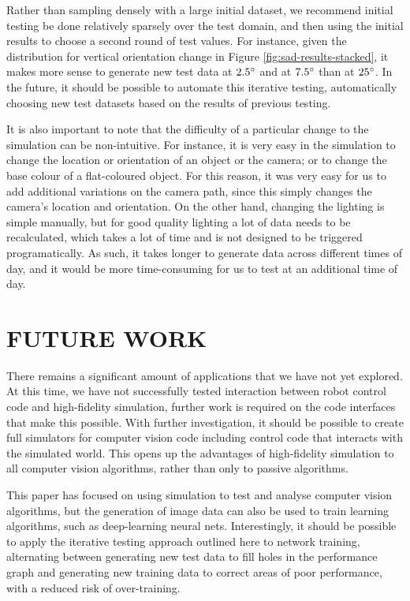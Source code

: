 \documentclass[letterpaper, 10 pt, conference]{ieeeconf}  %
\begin{document}
Rather than sampling densely with a large initial dataset, we recommend initial testing be done relatively sparsely over the test domain, and then using the initial results to choose a second round of test values. For instance, given the distribution for vertical orientation change in Figure \ref{fig:sad-results-stacked}, it makes more sense to generate new test data at $2.5\degree$ and at $7.5\degree$ than at $25\degree$. In the future, it should be possible to automate this iterative testing, automatically choosing new test datasets based on the results of previous testing.

It is also important to note that the difficulty of a particular change to the simulation can be non-intuitive. For instance, it is very easy in the simulation to change the location or orientation of an object or the camera; or to change the base colour of a flat-coloured object. For this reason, it was very easy for us to add additional variations on the camera path, since this simply changes the camera's location and orientation. On the other hand, changing the lighting is simple manually, but for good quality lighting a lot of data needs to be recalculated, which takes a lot of time and is not designed to be triggered programatically. As such, it takes longer to generate data across different times of day, and it would be more time-consuming for us to test at an additional time of day.

\section{FUTURE WORK}

There remains a significant amount of applications that we have not yet explored. At this time, we have not successfully tested interaction between robot control code and high-fidelity simulation, further work is required on the code interfaces that make this possible. With further investigation, it should be possible to create full simulators for computer vision code including control code that interacts with the simulated world. This opens up the advantages of high-fidelity simulation to all computer vision algorithms, rather than only to passive algorithms.

This paper has focused on using simulation to test and analyse computer vision algorithms, but the generation of image data can also be used to train learning algorithms, such as deep-learning neural nets. Interestingly, it should be possible to apply the iterative testing approach outlined here to network training, alternating between generating new test data to fill holes in the performance graph and generating new training data to correct areas of poor performance, with a reduced risk of over-training.
\end{document}
